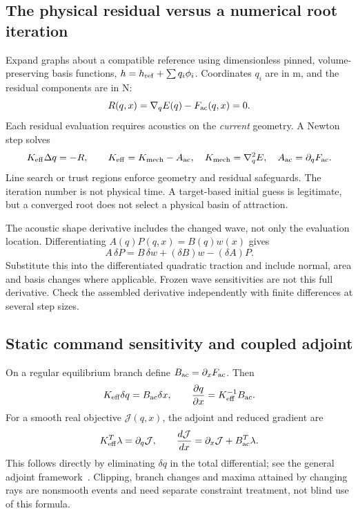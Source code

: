 \subsection{The physical residual versus a numerical root iteration}
Expand graphs about a compatible reference using dimensionless pinned,
volume-preserving basis functions, $h=h_{\rm ref}+\sum q_i\phi_i$.
Coordinates $q_i$ are in m, and the residual components are in N:
\begin{equation}\label{eq:residual}
 R(q,x)=\nabla_qE(q)-F_{\rm ac}(q,x)=0.
\end{equation}
Each residual evaluation requires acoustics on the \emph{current} geometry.
A Newton step solves
\begin{equation}\label{eq:newton}
 K_{\rm eff}\Delta q=-R,\qquad
 K_{\rm eff}=K_{\rm mech}-A_{\rm ac},\quad
 K_{\rm mech}=\nabla_q^2E,\quad A_{\rm ac}=\partial_qF_{\rm ac}.
\end{equation}
Line search or trust regions enforce geometry and residual safeguards. The
iteration number is not physical time. A target-based initial guess is
legitimate, but a converged root does not select a physical basin of attraction.

The acoustic shape derivative includes the changed wave, not only the
evaluation location. Differentiating $A(q)P(q,x)=B(q)w(x)$ gives
\begin{equation}\label{eq:wave-shape}
 A\,\delta P=B\,\delta w+(\delta B)w-(\delta A)P.
\end{equation}
Substitute this into the differentiated quadratic traction and include
normal, area and basis changes where applicable. Frozen wave sensitivities
are not this full derivative. Check the assembled derivative independently
with finite differences at several step sizes.

\subsection{Static command sensitivity and coupled adjoint}
On a regular equilibrium branch define $B_{\rm ac}=\partial_xF_{\rm ac}$.
Then
\begin{equation}\label{eq:implicit-sensitivity}
 K_{\rm eff}\delta q=B_{\rm ac}\delta x,\qquad
 \frac{\partial q}{\partial x}=K_{\rm eff}^{-1}B_{\rm ac}.
\end{equation}
For a smooth real objective $\mathcal J(q,x)$, the adjoint and reduced gradient are
\begin{equation}\label{eq:adjoint}
 K_{\rm eff}^T\lambda=\partial_q\mathcal J,\qquad
 \frac{d\mathcal J}{dx}=\partial_x\mathcal J+B_{\rm ac}^T\lambda.
\end{equation}
This follows directly by eliminating $\delta q$ in the total differential;
see the general adjoint framework~\cite{giles2000}. Clipping, branch changes
and maxima attained by changing rays are nonsmooth events and need separate
constraint treatment, not blind use of this formula.

